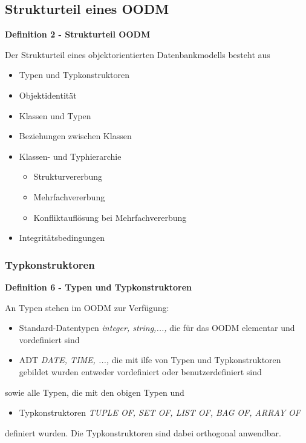 \subsection{Strukturteil eines OODM}
\begin{framed}
	\textbf{Definition 2 - Strukturteil OODM}
	\begin{description}
		\item Der Strukturteil eines objektorientierten Datenbankmodells besteht aus
		\begin{itemize}
			\item Typen und Typkonstruktoren
			\item Objektidentität
			\item Klassen und Typen
			\item Beziehungen zwischen Klassen
			\item Klassen- und Typhierarchie
			\begin{itemize}
				\item Strukturvererbung
				\item Mehrfachvererbung
				\item Konfliktauflösung bei Mehrfachvererbung
			\end{itemize}
			\item Integritätsbedingungen
		\end{itemize}
	\end{description}
\end{framed}

\subsubsection{Typkonstruktoren}
\begin{framed}
	\textbf{Definition 6 - Typen und Typkonstruktoren}
	\begin{description}
		\item An Typen stehen im OODM zur Verfügung:
		\begin{itemize}
			\item Standard-Datentypen \textit{integer, string,...,} die für das OODM elementar und vordefiniert sind
			\item ADT \textit{DATE, TIME, ...,} die mit ilfe von Typen und Typkonstruktoren gebildet wurden entweder vordefiniert oder benutzerdefiniert sind
		\end{itemize}
		
		\item sowie alle Typen, die mit den obigen Typen und
		\begin{itemize}
			\item Typkonstruktoren \textit{TUPLE OF, SET OF, LIST OF, BAG OF, ARRAY OF}
		\end{itemize}
		\item definiert wurden. Die Typkonstruktoren sind dabei orthogonal anwendbar.
	\end{description}
\end{framed}

